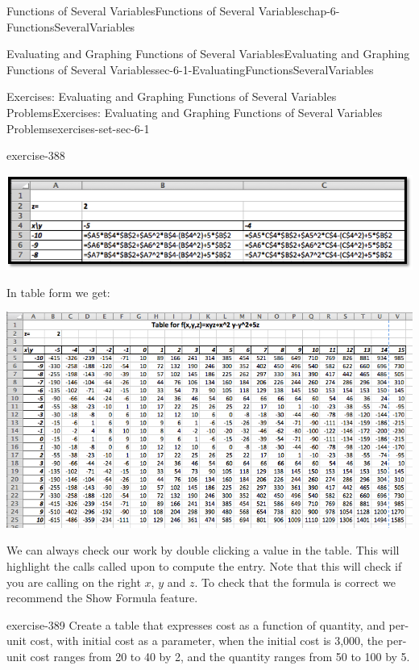 \documentclass[oneside,10pt,]{book}
\numberwithin{equation}{section}
\begin{document}
\begin{chapterptx}{Functions of Several Variables}{}{Functions of Several Variables}{}{}{chap-6-FunctionsSeveralVariables}
\begin{sectionptx}{Evaluating and Graphing Functions of Several Variables}{}{Evaluating and Graphing Functions of Several Variables}{}{}{sec-6-1-EvaluatingFunctionsSeveralVariables}
\begin{exercises-subsection-numberless}{Exercises: Evaluating and Graphing Functions of Several Variables Problems}{}{Exercises: Evaluating and Graphing Functions of Several Variables Problems}{}{}{exercises-set-sec-6-1}
\begin{exercisegroup}
\begin{divisionexerciseeg}{11}{}{}{exercise-388}
\begin{itemize}[label=\textbullet]
\end{itemize}
\begin{sidebyside}{1}{0.05}{0.05}{0}%
\begin{sbspanel}{0.9}%
\includegraphics[width=1\linewidth]{images/sec6-1-sol11a.png}
\end{sbspanel}%
\end{sidebyside}%
\par
\hypertarget{p-2189}{}%
In table form we get:%
\begin{sidebyside}{1}{0}{0}{0}%
\begin{sbspanel}{1}%
\includegraphics[width=1\linewidth]{images/sec6-1-sol11b.png}
\end{sbspanel}%
\end{sidebyside}%
\par
\hypertarget{p-2190}{}%
We can always check our work by double clicking a value in the table. This will highlight the calls called upon to compute the entry. Note that this will check if you are calling on the right \(x\), \(y\) and \(z\). To check that the formula is correct we recommend the Show Formula feature.%
\end{divisionexerciseeg}%
\begin{divisionexerciseeg}{12}{}{}{exercise-389}%
\hypertarget{p-2191}{}%
Create a table that expresses cost as a function of quantity, and per-unit cost, with initial cost as a parameter, when the initial cost is \textdollar{}3,000, the per-unit cost ranges from \textdollar{}20 to \textdollar{}40 by \textdollar{}2, and the quantity ranges from 50 to 100 by 5.%

\end{divisionexerciseeg}
\end{exercisegroup}
\end{exercises-subsection-numberless}
\end{sectionptx}
\end{chapterptx}
\end{document}
